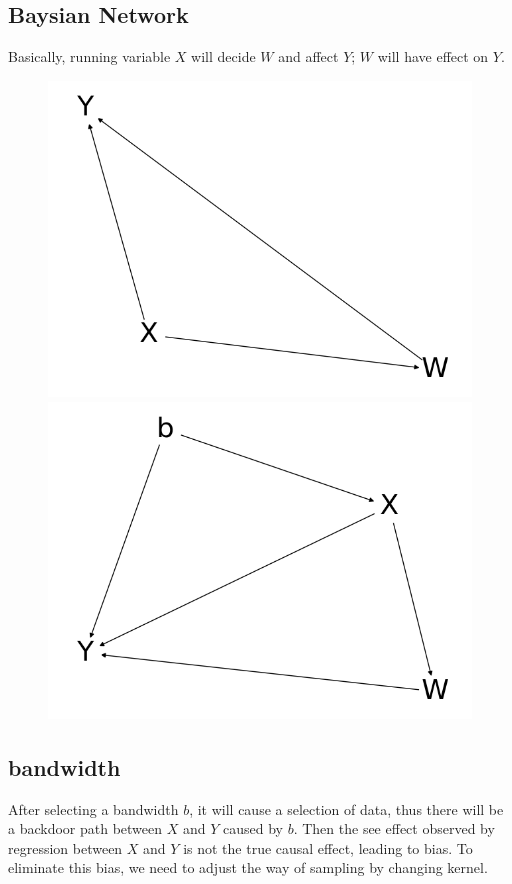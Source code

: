 \documentclass[a4 paper,12pt]{article}
\begin{document}
\subsection{Baysian Network}
Basically, running variable $X$ will decide $W$ and affect $Y$; $W$ will have effect on $Y$.

\begin{figure}[h]
	\centering
	\includegraphics[scale=0.5]{Figure_1.png}
	\includegraphics[scale=0.5]{Figure_2.png}
\end{figure}

\subsection*{bandwidth}
After selecting a bandwidth $b$, it will cause a selection of data, thus there will be a backdoor path between $X$ and $Y$ caused by $b$. Then the see effect observed by regression between $X$ and $Y$ is not the true causal effect, leading to bias. To eliminate this bias, we need to adjust the way of sampling by changing kernel. 
\end{document}
